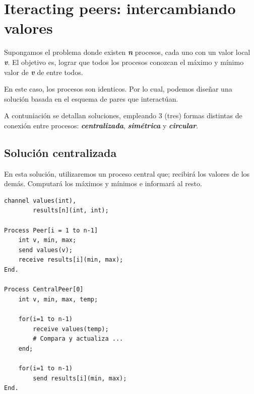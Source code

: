 \documentclass[a4paper, 10pt]{report}
\begin{document}
\section{Iteracting peers: intercambiando valores}

Supongamos el problema donde existen \textbf{\emph{n}} procesos, cada uno con un valor local \textbf{\emph{v}}. El objetivo es, lograr que todos los procesos conozcan el máximo y mínimo valor de \textbf{\emph{v}} de entre todos.

En este caso, los procesos son identicos. Por lo cual, podemos diseñar una solución basada en el esquema de pares que interactúan. 

A contuniación se detallan soluciones, empleando 3 (tres) formas distintas de conexión entre procesos: \textbf{\emph{centralizada}}, \textbf{\emph{simétrica}} y \textbf{\emph{circular}}.

\subsection{Solución centralizada}

En esta solución, utilizaremos un proceso central que; recibirá los valores de los demás. Computará los máximos y mínimos e informará al resto.

\begin{multicols}{2}
\begin{lstlisting}
channel values(int),
        results[n](int, int);
    
Process Peer[i = 1 to n-1]
    int v, min, max;
    send values(v);
    receive results[i](min, max);
End.

Process CentralPeer[0]
    int v, min, max, temp;

    for(i=1 to n-1)
        receive values(temp);
        # Compara y actualiza ...
    end;

    for(i=1 to n-1)
        send results[i](min, max);
End.
\end{lstlisting}

\columnbreak

\centering
\vspace*{\fill}
\vspace*{\fill}
\end{multicols}
\end{document}
